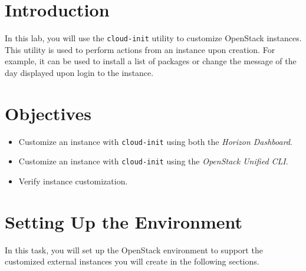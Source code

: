\documentclass[letterpaper, 12pt]{article}
\begin{document}

\section*{Introduction}
\label{sec:introduction}
In this lab, you will use the \texttt{cloud-init} utility to customize OpenStack instances. This utility is used to
perform actions from an instance upon creation. For example, it can be used to install a list of packages or change the
message of the day displayed upon login to the instance.

\section*{Objectives}
\label{sec:objectives}
\begin{itemize}[itemsep=0pt]
    \item Customize an instance with \texttt{cloud-init} using both the \textit{Horizon Dashboard}.
    \item Customize an instance with \texttt{cloud-init} using the \textit{OpenStack Unified CLI}.
    \item Verify instance customization.
\end{itemize}
\clearpage

\labsettings

\section{Setting Up the Environment}
\label{sec:settup_up_the_environment}
In this task, you will set up the OpenStack environment to support the customized external instances you will create in
the following sections.
\end{document}
